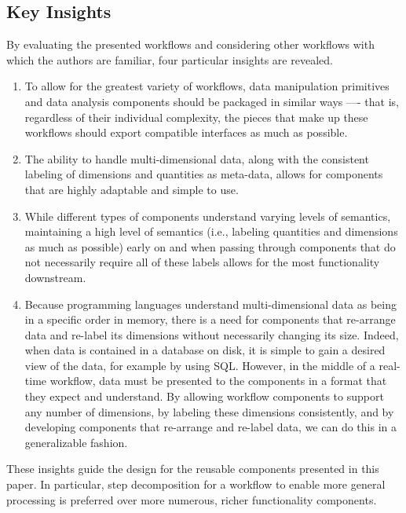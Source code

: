 \documentclass[conference]{IEEEtran}
\begin{document}
\subsection{Key Insights}

By evaluating the presented workflows and considering other workflows with
which the authors are familiar, four particular insights are revealed.

\begin{enumerate}

\item To allow for the greatest variety of workflows, data manipulation
primitives and data analysis components should be packaged in similar ways —-
that is, regardless of their individual complexity, the pieces that make up
these workflows should export compatible interfaces as much as possible.

\item The ability to handle multi-dimensional data, along with the consistent
labeling of dimensions and quantities as meta-data, allows for components that
are highly adaptable and simple to use.

\item While different types of components understand varying levels of
semantics, maintaining a high level of semantics (i.e., labeling quantities and
dimensions as much as possible) early on and when passing through components
that do not necessarily require all of these labels allows for the most
functionality downstream.

\item Because programming languages understand multi-dimensional data as being
in a specific order in memory, there is a need for components that re-arrange
data and re-label its dimensions without necessarily changing its size. Indeed,
when data is contained in a database on disk, it is simple to gain a desired
view of the data, for example by using SQL. However, in the middle of a
real-time workflow, data must be presented to the components in a format that
they expect and understand. By allowing workflow components to support any
number of dimensions, by labeling these dimensions consistently, and by
developing components that re-arrange and re-label data, we can do this in a
generalizable fashion.

\end{enumerate}

These insights guide the design for the reusable components presented in this
paper. In particular, step decomposition for a workflow to enable more general
processing is preferred over more numerous, richer functionality components.
\end{document}
